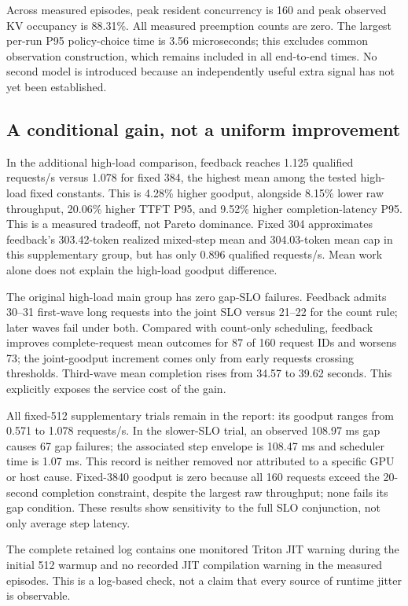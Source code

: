 Across measured episodes, peak resident concurrency is 160 and peak observed KV occupancy is 88.31\%. All measured preemption counts are zero. The largest per-run P95 policy-choice time is 3.56 microseconds; this excludes common observation construction, which remains included in all end-to-end times. No second model is introduced because an independently useful extra signal has not yet been established.

\subsection{A conditional gain, not a uniform improvement}

In the additional high-load comparison, feedback reaches 1.125 qualified requests/s versus 1.078 for fixed 384, the highest mean among the tested high-load fixed constants. This is 4.28\% higher goodput, alongside 8.15\% lower raw throughput, 20.06\% higher TTFT P95, and 9.52\% higher completion-latency P95. This is a measured tradeoff, not Pareto dominance. Fixed 304 approximates feedback's 303.42-token realized mixed-step mean and 304.03-token mean cap in this supplementary group, but has only 0.896 qualified requests/s. Mean work alone does not explain the high-load goodput difference.

The original high-load main group has zero gap-SLO failures. Feedback admits 30--31 first-wave long requests into the joint SLO versus 21--22 for the count rule; later waves fail under both. Compared with count-only scheduling, feedback improves complete-request mean outcomes for 87 of 160 request IDs and worsens 73; the joint-goodput increment comes only from early requests crossing thresholds. Third-wave mean completion rises from 34.57 to 39.62 seconds. This explicitly exposes the service cost of the gain.

All fixed-512 supplementary trials remain in the report: its goodput ranges from 0.571 to 1.078 requests/s. In the slower-SLO trial, an observed 108.97 ms gap causes 67 gap failures; the associated step envelope is 108.47 ms and scheduler time is 1.07 ms. This record is neither removed nor attributed to a specific GPU or host cause. Fixed-3840 goodput is zero because all 160 requests exceed the 20-second completion constraint, despite the largest raw throughput; none fails its gap condition. These results show sensitivity to the full SLO conjunction, not only average step latency.

The complete retained log contains one monitored Triton JIT warning during the initial 512 warmup and no recorded JIT compilation warning in the measured episodes. This is a log-based check, not a claim that every source of runtime jitter is observable.
